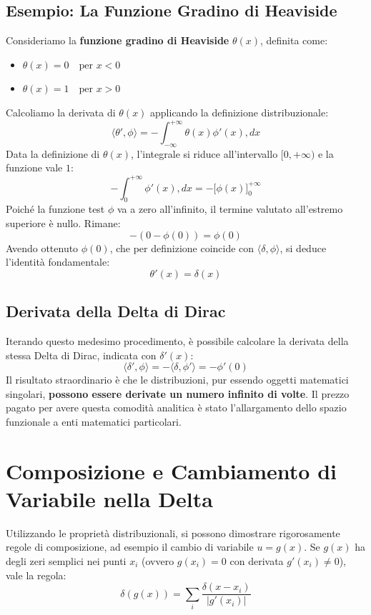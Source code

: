 \subsection{Esempio: La Funzione Gradino di Heaviside}
Consideriamo la \textbf{funzione gradino di Heaviside} $\theta(x)$, definita come:
\begin{itemize}
\item $\theta(x) = 0 \quad \text{per } x < 0$
\item $\theta(x) = 1 \quad \text{per } x > 0$
\end{itemize}
Calcoliamo la derivata di $\theta(x)$ applicando la definizione distribuzionale:
\begin{equation}
\langle \theta', \phi \rangle = - \int_{-\infty}^{+\infty} \theta(x) \phi'(x) , dx
\end{equation}
Data la definizione di $\theta(x)$, l'integrale si riduce all'intervallo $[0, +\infty)$ e la funzione vale $1$:
\begin{equation}
- \int_{0}^{+\infty} \phi'(x) , dx = - \Big[ \phi(x) \Big]_0^{+\infty}
\end{equation}
Poiché la funzione test $\phi$ va a zero all'infinito, il termine valutato all'estremo superiore è nullo. Rimane:
\begin{equation}
- (0 - \phi(0)) = \phi(0)
\end{equation}
Avendo ottenuto $\phi(0)$, che per definizione coincide con $\langle \delta, \phi \rangle$, si deduce l'identità fondamentale:
\begin{equation}
\theta'(x) = \delta(x)
\end{equation}

\subsection{Derivata della Delta di Dirac}
Iterando questo medesimo procedimento, è possibile calcolare la derivata della stessa Delta di Dirac, indicata con $\delta'(x)$:
\begin{equation}
\langle \delta', \phi \rangle = - \langle \delta, \phi' \rangle = - \phi'(0)
\end{equation}
Il risultato straordinario è che le distribuzioni, pur essendo oggetti matematici singolari, \textbf{possono essere derivate un numero infinito di volte}. Il prezzo pagato per avere questa comodità analitica è stato l'allargamento dello spazio funzionale a enti matematici particolari.

\section{Composizione e Cambiamento di Variabile nella Delta}
Utilizzando le proprietà distribuzionali, si possono dimostrare rigorosamente regole di composizione, ad esempio il cambio di variabile $u = g(x)$. Se $g(x)$ ha degli zeri semplici nei punti $x_i$ (ovvero $g(x_i) = 0$ con derivata $g'(x_i) \neq 0$), vale la regola:
\begin{equation}
\delta(g(x)) = \sum_i \frac{\delta(x - x_i)}{|g'(x_i)|}
\end{equation}

